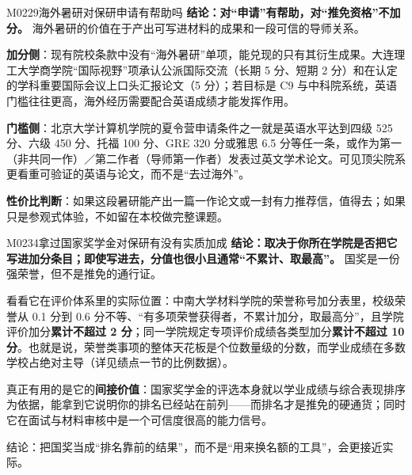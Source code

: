 \begin{qa}{M0229}{海外暑研对保研申请有帮助吗}
\textbf{结论：对“申请”有帮助，对“推免资格”不加分。} 海外暑研的价值在于产出可写进材料的成果和一段可信的导师关系。

\textbf{加分侧}：现有院校条款中没有“海外暑研”单项，能兑现的只有其衍生成果。大连理工大学商学院“国际视野”项承认公派国际交流（长期 5 分、短期 2 分）和在认定的学科重要国际会议上口头汇报论文（5 分）；若目标是 C9 与中科院系统，英语门槛往往更高，海外经历需要配合英语成绩才能发挥作用。

\textbf{门槛侧}：北京大学计算机学院的夏令营申请条件之一就是英语水平达到四级 525 分、六级 450 分、托福 100 分、GRE 320 分或雅思 6.5 分等任一条，或作为第一（非共同一作）／第二作者（导师第一作者）发表过英文学术论文。可见顶尖院系更看重可验证的英语与论文，而不是“去过海外”。

\textbf{性价比判断}：如果这段暑研能产出一篇一作论文或一封有力推荐信，值得去；如果只是参观式体验，不如留在本校做完整课题。
\end{qa}

\begin{qa}{M0234}{拿过国家奖学金对保研有没有实质加成}
\textbf{结论：取决于你所在学院是否把它写进加分条目；即使写进去，分值也很小且通常“不累计、取最高”。} 国奖是一份强荣誉，但不是推免的通行证。

看看它在评价体系里的实际位置：中南大学材料学院的荣誉称号加分表里，校级荣誉从 0.1 分到 0.6 分不等、“有多项荣誉获得者，不累计加分，取最高分”，且学院评价加分\textbf{累计不超过 2 分}；同一学院规定专项评价成绩各类型加分\textbf{累计不超过 10 分}。也就是说，荣誉类事项的整体天花板是个位数量级的分数，而学业成绩在多数学校占绝对主导（详见绩点一节的比例数据）。

真正有用的是它的\textbf{间接价值}：国家奖学金的评选本身就以学业成绩与综合表现排序为依据，能拿到它说明你的排名已经站在前列——而排名才是推免的硬通货；同时它在面试与材料审核中是一个可信度很高的能力信号。

结论：把国奖当成“排名靠前的结果”，而不是“用来换名额的工具”，会更接近实际。
\end{qa}


